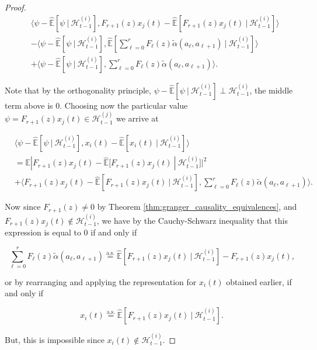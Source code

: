 \documentclass{statsoc}
\def\H{\mathcal{H}}  %
\newcommand{\linE}[2]{\hat{\E}[#1\ |\ #2]}  %
\newcommand{\wtalpha}[2]{\widetilde{\alpha}(#1, #2)}  %
\def\H{\mathcal{H}}  %
\def\E{\mathbb{E}}  %
\newcommand{\inner}[2]{\langle #1, #2 \rangle}  %
\begin{document}
\begin{proof}
  \begin{align*}
    &\inner{\psi - \linE{\psi}{\H_{t - 1}^{(i)}}}{F_{r + 1}(z)x_j(t) - \linE{F_{r + 1}(z)x_j(t)}{\H_{t - 1}^{(i)}}}\\
    &- \inner{\psi - \linE{\psi}{\H_{t - 1}^{(i)}}}{\linE{\sum_{\ell = 0}^r F_\ell(z)\wtalpha{a_\ell}{a_{\ell + 1}}}{\H_{t - 1}^{(i)}}}\\
    &+ \inner{\psi - \linE{\psi}{\H_{t - 1}^{(i)}}}{\sum_{\ell = 0}^r F_\ell(z)\wtalpha{a_\ell}{a_{\ell + 1}}}.
  \end{align*}

  Note that by the orthogonality principle, $\psi - \linE{\psi}{\H_{t - 1}^{(i)}} \perp \H_{t - 1}^{(i)}$, the middle term above is $0$.  Choosing now the particular value $\psi = F_{r + 1}(z)x_j(t) \in \H_{t - 1}^{(j)}$ we arrive at

  \begin{align*}
    &\inner{\psi - \linE{\psi}{\H_{t - 1}^{(i)}}}{x_i(t) - \linE{x_i(t)}{\H_{t - 1}^{(i)}}}\\
    &= \E|F_{r + 1}(z)x_j(t) - \linE{F_{r + 1}(z)x_j(t)}{\H_{t - 1}^{(i)}}|^2\\
    &+ \inner{F_{r + 1}(z)x_j(t) - \linE{F_{r + 1}(z)x_j(t)}{\H_{t - 1}^{(i)}}}{\sum_{\ell = 0}^r F_\ell(z) \wtalpha{a_\ell}{a_{\ell + 1}}}.
  \end{align*}

  Now since $F_{r + 1}(z) \ne 0$ by Theorem
  \ref{thm:granger_causality_equivalences}, and
  $F_{r + 1}(z)x_j(t) \not\in \H_{t - 1}^{(i)}$, we have by the
  Cauchy-Schwarz inequality that this expression is equal to $0$ if
  and only if

  \begin{equation*}
    \sum_{\ell = 0}^r F_\ell(z) \wtalpha{a_\ell}{a_{\ell + 1}} \overset{\text{a.s.}}{=} \linE{F_{r + 1}(z)x_j(t)}{\H_{t - 1}^{(i)}} - F_{r + 1}(z)x_j(t),
  \end{equation*}

  or by rearranging and applying the representation for $x_i(t)$
  obtained earlier, if and only if

  \begin{equation*}
    x_i(t) \overset{\text{a.s.}}{=} \linE{F_{r + 1}(z)x_j(t)}{\H_{t - 1}^{(i)}}.
  \end{equation*}

  But, this is impossible since $x_i(t) \not \in \H_{t - 1}^{(i)}$.
\end{proof}
\end{document}

